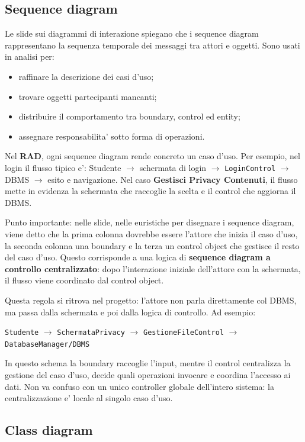 ﻿\documentclass[11pt,a4paper]{article}
\newcommand{\doc}[1]{\textbf{#1}}
\newcommand{\term}[1]{\textbf{#1}}
\begin{document}
\subsection{Sequence diagram}

Le slide sui diagrammi di interazione spiegano che i sequence diagram rappresentano
la sequenza temporale dei messaggi tra attori e oggetti. Sono usati in analisi per:
\begin{itemize}
  \item raffinare la descrizione dei casi d'uso;
  \item trovare oggetti partecipanti mancanti;
  \item distribuire il comportamento tra boundary, control ed entity;
  \item assegnare responsabilita' sotto forma di operazioni.
\end{itemize}

Nel \doc{RAD}, ogni sequence diagram rende concreto un caso d'uso. Per esempio, nel
login il flusso tipico e': Studente $\rightarrow$ schermata di login $\rightarrow$
\texttt{LoginControl} $\rightarrow$ DBMS $\rightarrow$ esito e navigazione. Nel caso
\term{Gestisci Privacy Contenuti}, il flusso mette in evidenza la schermata che raccoglie
la scelta e il control che aggiorna il DBMS.

Punto importante: nelle slide, nelle euristiche per disegnare i sequence diagram, viene
detto che la prima colonna dovrebbe essere l'attore che inizia il caso d'uso, la seconda
colonna una boundary e la terza un control object che gestisce il resto del caso d'uso.
Questo corrisponde a una logica di \term{sequence diagram a controllo centralizzato}:
dopo l'interazione iniziale dell'attore con la schermata, il flusso viene coordinato dal
control object.

Questa regola si ritrova nel progetto: l'attore non parla direttamente col DBMS, ma passa
dalla schermata e poi dalla logica di controllo. Ad esempio:
\begin{center}
\texttt{Studente} $\rightarrow$ \texttt{SchermataPrivacy} $\rightarrow$
\texttt{GestioneFileControl} $\rightarrow$ \texttt{DatabaseManager/DBMS}
\end{center}
In questo schema la boundary raccoglie l'input, mentre il control centralizza la gestione
del caso d'uso, decide quali operazioni invocare e coordina l'accesso ai dati. Non va
confuso con un unico controller globale dell'intero sistema: la centralizzazione e'
locale al singolo caso d'uso.

\subsection{Class diagram}
\end{document}
